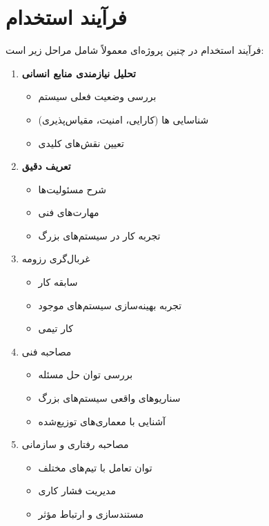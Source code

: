 \documentclass[12pt,a4paper]{report}
\begin{document}
\section{فرآیند استخدام}
فرآیند استخدام در چنین پروژه‌ای معمولاً شامل مراحل زیر است:
\begin{enumerate}
	\item \textbf{تحلیل نیازمندی منابع انسانی}
\begin{itemize}
	\item 
بررسی وضعیت فعلی سیستم
	\item 
شناسایی ها (کارایی، امنیت، مقیاس‌پذیری)
	\item 
تعیین نقش‌های کلیدی
\end{itemize}
\item \textbf{تعریف  دقیق}
\begin{itemize}
	\item 
شرح مسئولیت‌ها
\item 
مهارت‌های فنی
\item 
تجربه کار در سیستم‌های بزرگ
\end{itemize}
\newpage
\item 
غربال‌گری رزومه
\begin{itemize}
	\item 
سابقه کار 
\item 
تجربه بهینه‌سازی سیستم‌های موجود
\item
کار تیمی
\end{itemize}
\item 
مصاحبه فنی
\begin{itemize}
	\item 
بررسی توان حل مسئله
	\item 
سناریوهای واقعی سیستم‌های بزرگ
	\item 
آشنایی با معماری‌های توزیع‌شده
\end{itemize}
	\item 
مصاحبه رفتاری و سازمانی
\begin{itemize}
	\item 
توان تعامل با تیم‌های مختلف
\item 
مدیریت فشار کاری
\item 
مستندسازی و ارتباط مؤثر
\end{itemize}
\end{enumerate}
\end{document}
